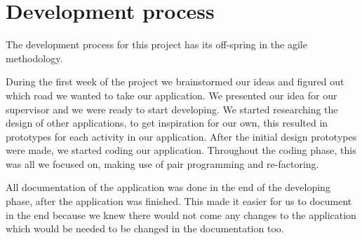 \chapter{Development process}
The development process for this project has its off-spring in the agile methodology. 

During the first week of the project we brainstormed our ideas and figured out which road we wanted to take our application. We presented our idea for our supervisor and we were ready to start developing. We started researching the design of other applications, to get inspiration for our own, this resulted in prototypes for each activity in our application. After the initial design prototypes were made, we started coding our application. Throughout the coding phase, this was all we focused on, making use of pair programming and re-factoring. 

All documentation of the application was done in the end of the developing phase, after the application was finished. This made it easier for us to document in the end because we knew there would not come any changes to the application which would be needed to be changed in the documentation too.

